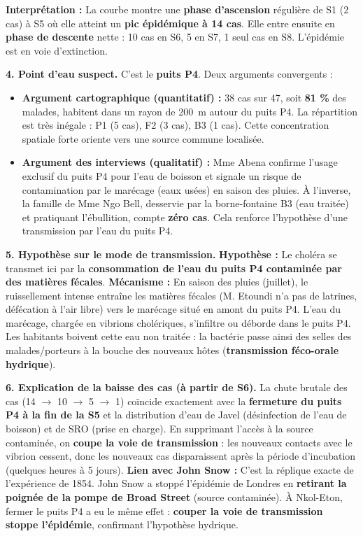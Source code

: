 \documentclass[11pt]{article}
\begin{document}
\begin{exoresolu}
\textbf{Interprétation :} La courbe montre une \textbf{phase d'ascension} régulière de S1 (2 cas) à S5 où elle atteint un \textbf{pic épidémique à 14 cas}. Elle entre ensuite en \textbf{phase de descente} nette : 10 cas en S6, 5 en S7, 1 seul cas en S8. L'épidémie est en voie d'extinction.

\textbf{4. Point d'eau suspect.}
C'est le \textbf{puits P4}. Deux arguments convergents :
\begin{itemize}
\item \textbf{Argument cartographique (quantitatif) :} 38 cas sur 47, soit \textbf{81 \%} des malades, habitent dans un rayon de \SI{200}{m} autour du puits P4. La répartition est très inégale : P1 (5 cas), F2 (3 cas), B3 (1 cas). Cette concentration spatiale forte oriente vers une source commune localisée.
\item \textbf{Argument des interviews (qualitatif) :} Mme Abena confirme l'usage exclusif du puits P4 pour l'eau de boisson et signale un risque de contamination par le marécage (eaux usées) en saison des pluies. À l'inverse, la famille de Mme Ngo Bell, desservie par la borne-fontaine B3 (eau traitée) et pratiquant l'ébullition, compte \textbf{zéro cas}. Cela renforce l'hypothèse d'une transmission par l'eau du puits P4.
\end{itemize}

\textbf{5. Hypothèse sur le mode de transmission.}
\textbf{Hypothèse :} Le choléra se transmet ici par la \textbf{consommation de l'eau du puits P4 contaminée par des matières fécales}.
\textbf{Mécanisme :} En saison des pluies (juillet), le ruissellement intense entraîne les matières fécales (M. Etoundi n'a pas de latrines, défécation à l'air libre) vers le marécage situé en amont du puits P4. L'eau du marécage, chargée en vibrions cholériques, s'infiltre ou déborde dans le puits P4. Les habitants boivent cette eau non traitée : la bactérie passe ainsi des selles des malades/porteurs à la bouche des nouveaux hôtes (\textbf{transmission féco-orale hydrique}).

\textbf{6. Explication de la baisse des cas (à partir de S6).}
La chute brutale des cas (14 $\rightarrow$ 10 $\rightarrow$ 5 $\rightarrow$ 1) coïncide exactement avec la \textbf{fermeture du puits P4 à la fin de la S5} et la distribution d'eau de Javel (désinfection de l'eau de boisson) et de SRO (prise en charge). En supprimant l'accès à la source contaminée, on \textbf{coupe la voie de transmission} : les nouveaux contacts avec le vibrion cessent, donc les nouveaux cas disparaissent après la période d'incubation (quelques heures à 5 jours).
\textbf{Lien avec John Snow :} C'est la réplique exacte de l'expérience de 1854. John Snow a stoppé l'épidémie de Londres en \textbf{retirant la poignée de la pompe de Broad Street} (source contaminée). À Nkol-Eton, fermer le puits P4 a eu le même effet : \textbf{couper la voie de transmission stoppe l'épidémie}, confirmant l'hypothèse hydrique.


\end{exoresolu}
\end{document}
